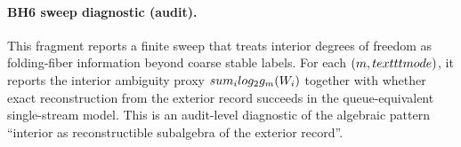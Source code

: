 \paragraph{BH6 sweep diagnostic (audit).} \AuditTag This fragment reports a finite sweep that treats interior degrees of freedom as folding-fiber information beyond coarse stable labels. For each $(m,\\texttt{mode})$, it reports the interior ambiguity proxy $\\sum_i\\log_2 g_m(W_i)$ together with whether exact reconstruction from the exterior record succeeds in the queue-equivalent single-stream model. This is an audit-level diagnostic of the algebraic pattern ``interior as reconstructible subalgebra of the exterior record''.